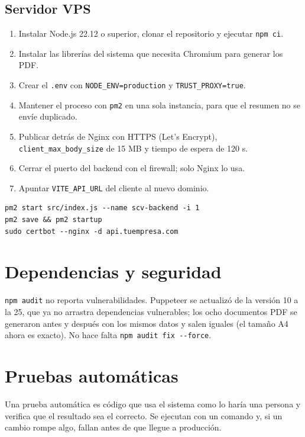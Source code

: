 \documentclass[11pt,letterpaper]{article}
\newcommand{\code}[1]{\nolinkurl{#1}}
\begin{document}
\subsection{Servidor VPS}
\begin{enumerate}
  \item Instalar Node.js 22.12 o superior, clonar el repositorio y ejecutar \code{npm ci}.
  \item Instalar las librerías del sistema que necesita Chromium para generar los PDF.
  \item Crear el \code{.env} con \code{NODE_ENV=production} y \code{TRUST_PROXY=true}.
  \item Mantener el proceso con \code{pm2} en una sola instancia, para que el resumen no se envíe duplicado.
  \item Publicar detrás de Nginx con HTTPS (Let's Encrypt), \code{client_max_body_size} de 15 MB y tiempo de espera de 120 s.
  \item Cerrar el puerto del backend con el firewall; solo Nginx lo usa.
  \item Apuntar \code{VITE_API_URL} del cliente al nuevo dominio.
\end{enumerate}

\begin{lstlisting}
pm2 start src/index.js --name scv-backend -i 1
pm2 save && pm2 startup
sudo certbot --nginx -d api.tuempresa.com
\end{lstlisting}

\section{Dependencias y seguridad}
\code{npm audit} no reporta vulnerabilidades. Puppeteer se actualizó de la versión 10 a la 25, que ya no arrastra dependencias vulnerables; los ocho documentos PDF se generaron antes y después con los mismos datos y salen iguales (el tamaño A4 ahora es exacto). No hace falta \code{npm audit fix --force}.

\section{Pruebas automáticas}
Una prueba automática es código que usa el sistema como lo haría una persona y verifica que el resultado sea el correcto. Se ejecutan con un comando y, si un cambio rompe algo, fallan antes de que llegue a producción.
\end{document}
